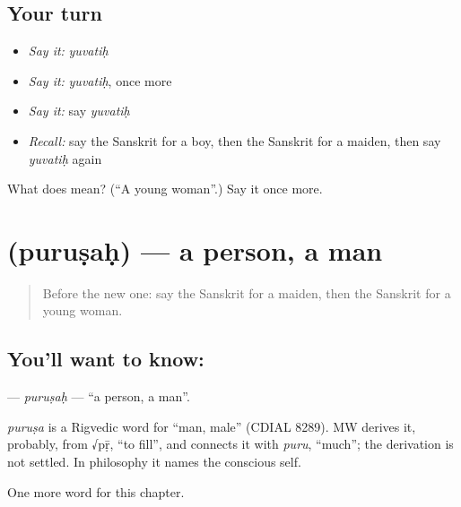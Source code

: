 \subsection*{Your turn}
\begin{itemize}
\raggedright
  \item \emph{Say it:} \emph{yuvatiḥ}
  \item \emph{Say it:} \emph{yuvatiḥ}, once more
  \item \emph{Say it:} say \emph{yuvatiḥ}
  \item \emph{Recall:} say the Sanskrit for a boy, then the Sanskrit for a maiden, then say \emph{yuvatiḥ} again
\end{itemize}

\begin{tcolorbox}[breakable,colback=teal!4,colframe=teal!35!black,title={Before you move on}]
What does  mean? (\textquotedblleft{}A young woman\textquotedblright{}.) Say it once more.
\end{tcolorbox}
\section[\texorpdfstring{\sk{पुरुषः} (puruṣaḥ)}{पुरुषः (puruṣaḥ)}]{ (puruṣaḥ) — a person, a man}

\label{lesson:SA-C236-purusah}



\begin{quote}
Before the new one: say the Sanskrit for a maiden, then the Sanskrit for a young woman.
\end{quote}

\subsection*{You'll want to know: }
\textbf{} — \emph{puruṣaḥ} — \textquotedblleft{}a person, a man\textquotedblright{}.

\begin{cousinweb}
\emph{puruṣa} is a Rigvedic word for \textquotedblleft{}man, male\textquotedblright{} (CDIAL 8289). MW derives it, probably, from √pṝ, \textquotedblleft{}to fill\textquotedblright{}, and connects it with \emph{puru}, \textquotedblleft{}much\textquotedblright{}; the derivation is not settled. In philosophy it names the conscious self.
\end{cousinweb}

\begin{grammarlens}[title={What you've built}]
One more word for this chapter.
\end{grammarlens}


